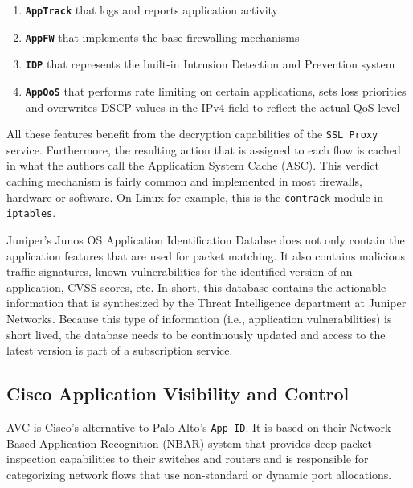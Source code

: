 \begin{enumerate}
    \item \textbf{\texttt{AppTrack}} that logs and reports application activity
    \item \textbf{\texttt{AppFW}} that implements the base firewalling mechanisms
    \item \textbf{\texttt{IDP}} that represents the built-in Intrusion Detection
          and Prevention system
    \item \textbf{\texttt{AppQoS}} that performs rate limiting on certain
           applications, sets loss priorities and overwrites DSCP values in the
           IPv4 field to reflect the actual QoS level
\end{enumerate}

All these features benefit from the decryption capabilities of the
\texttt{SSL Proxy} service. Furthermore, the resulting action that is assigned to
each flow is cached in what the authors call the Application System Cache (ASC).
This verdict caching mechanism is fairly common and implemented in most firewalls,
hardware or software. On Linux for example, this is the \texttt{contrack} module
in \texttt{iptables}.

Juniper's Junos OS Application Identification Databse does not only contain the
application features that are used for packet matching. It also contains
malicious traffic signatures, known vulnerabilities for the identified version
of an application, CVSS scores, etc. In short, this database contains the
actionable information that is synthesized by the Threat Intelligence department
at Juniper Networks. Because this type of information (i.e., application
vulnerabilities) is short lived, the database needs to be continuously updated
and access to the latest version is part of a subscription service.

\subsection{Cisco Application Visibility and Control}

AVC is Cisco's alternative to Palo Alto's \texttt{App-ID}. It is based on their
Network Based Application Recognition (NBAR) system that provides deep packet
inspection capabilities to their switches and routers and is responsible
for categorizing network flows that use non-standard or dynamic port allocations.

